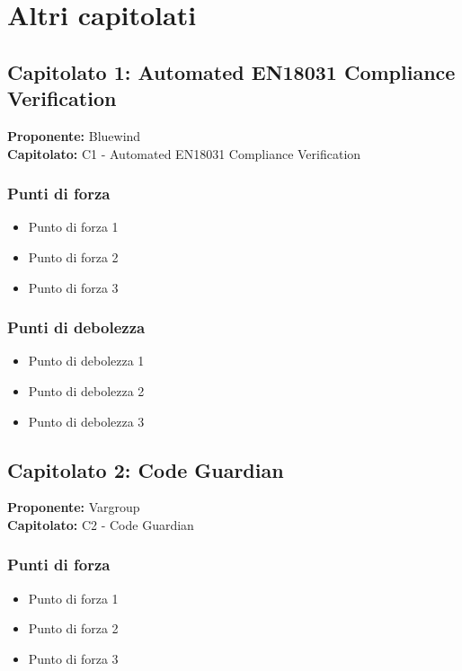 \documentclass[a4paper,12pt]{article}
\begin{document}
\newpage

\section{Altri capitolati}

\subsection{Capitolato 1: Automated EN18031 Compliance Verification}

\begin{tcolorbox}[colback=lightgray!30,colframe=darkgray,arc=2mm,boxrule=0.3pt]
\textbf{Proponente:} Bluewind \\
\textbf{Capitolato:} C1 - Automated EN18031 Compliance Verification
\end{tcolorbox}

\subsubsection{Punti di forza}
\begin{itemize}
\item Punto di forza 1
\item Punto di forza 2
\item Punto di forza 3
\end{itemize}

\subsubsection{Punti di debolezza}
\begin{itemize}
\item Punto di debolezza 1
\item Punto di debolezza 2
\item Punto di debolezza 3
\end{itemize}

\subsection{Capitolato 2: Code Guardian}

\begin{tcolorbox}[colback=lightgray!30,colframe=darkgray,arc=2mm,boxrule=0.3pt]
\textbf{Proponente:} Vargroup \\
\textbf{Capitolato:} C2 - Code Guardian
\end{tcolorbox}

\subsubsection{Punti di forza}
\begin{itemize}
\item Punto di forza 1
\item Punto di forza 2
\item Punto di forza 3
\end{itemize}
\end{document}

